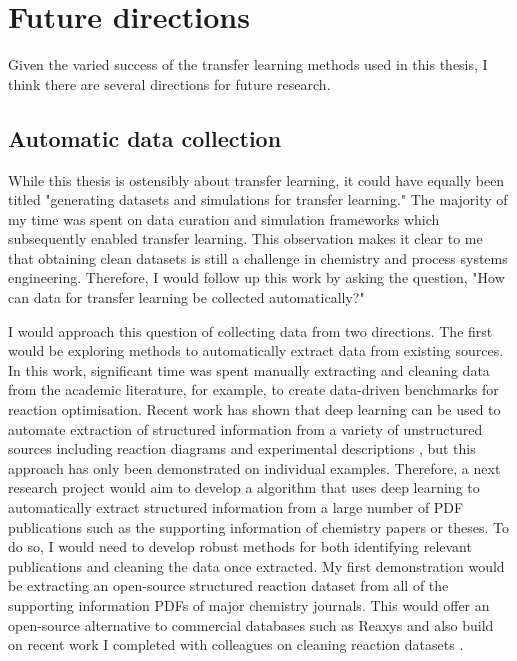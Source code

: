 \section{Future directions}

Given the varied success of the transfer learning methods used in this thesis, I think there are several directions for future research.


\subsection{Automatic data collection}

While this thesis is ostensibly about transfer learning, it could have equally been titled "generating datasets and simulations for transfer learning." The majority of my time was spent on data curation and simulation frameworks which subsequently enabled transfer learning.  This observation makes it clear to me that obtaining clean datasets is still a challenge in chemistry and process systems engineering. Therefore, I would follow up this work by asking the question, "How can data for transfer learning be collected automatically?"

I would approach this question of collecting data from two directions. The first would be exploring methods to automatically extract data from existing sources. In this work, significant time was spent manually extracting and cleaning data from the academic literature, for example, to create data-driven benchmarks for reaction optimisation. Recent work has shown that deep learning can be used to automate extraction of structured information from a variety of unstructured sources including reaction diagrams\cite{Qian2023} and experimental descriptions \cite{Guo2021}, but this approach has only been demonstrated on individual examples. Therefore, a next research project would aim to develop a algorithm that uses deep learning to  automatically extract structured information from a large number of PDF publications such as the supporting information of chemistry papers or theses. To do so, I would need to develop robust methods for both identifying relevant publications and cleaning the data once extracted.  My first demonstration would be extracting an open-source structured reaction dataset from all of the supporting information PDFs of major chemistry journals. This would offer an open-source alternative to commercial databases such as Reaxys \cite{elsevier_reaxys_2009} and also build on recent work I completed with colleagues on cleaning reaction datasets \cite{Wigh2023}.

